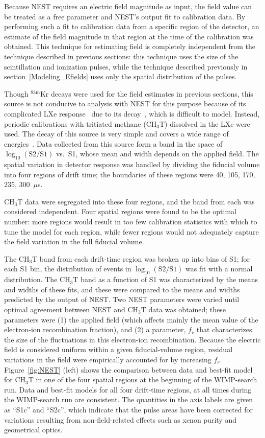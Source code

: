 \documentclass[11pt,a4paper]{article}
\newcommand{\isot}[2]{$^{\textrm{#2}}$#1 }
\newcommand{\krm}{\isot{Kr}{83m}}
\begin{document}
Because NEST requires an electric field magnitude as input, the field value can be treated as a free parameter and NEST's output fit to calibration data. By performing such a fit to calibration data from a specific region of the detector, an estimate of the field magnitude in that region at the time of the calibration was obtained. This technique for estimating field is completely independent from the technique described in previous sections: this technique uses the size of the scintillation and ionization pulses, while the technique described previously in section~\ref{Modeling_Efields} uses only the spatial distribution of the pulses.

Though \krm decays were used for the field estimates in previous sections, this source is not conducive to analysis with NEST for this purpose because of its complicated LXe response~\cite{Baudis:2013cca} due to its decay~\cite{Chan:1995tk}, which is difficult to model. Instead, periodic calibrations with tritiated methane (CH$_3$T) dissolved in the LXe were used. The decay of this source is very simple and covers a wide range of energies~\cite{Akerib:2015wdi}. Data collected from this source form a band in the space of $\log_{10}(\mathrm{S2/S1})$ vs.~S1, whose mean and width depends on the applied field. The spatial variation in detector response was handled by dividing the fiducial volume into four regions of drift time; the boundaries of these regions were 40, 105, 170, 235, 300~$\mu$s.

CH$_3$T data were segregated into these four regions, and the band from each was considered independent. Four spatial regions were found to be the optimal number: more regions would result in too few calibration statistics with which to tune the model for each region, while fewer regions would not adequately capture the field variation in the full fiducial volume.

The CH$_3$T band from each drift-time region was broken up into bins of S1; for each S1 bin, the distribution of events in $\log_{10}(\mathrm{S2/S1})$ was fit with a normal distribution. The CH$_3$T band as a function of S1 was characterized by the means and widths of these fits, and these were compared to the means and widths predicted by the output of NEST. Two NEST parameters were varied until optimal agreement between NEST and CH$_3$T data was obtained; these parameters were (1) the applied field (which affects mainly the mean value of the electron-ion recombination fraction), and (2) a parameter, $f_r$ that characterizes the size of the fluctuations in this electron-ion recombination. Because the electric field is considered uniform within a given fiducial-volume region, residual variations in the field were empirically accounted for by increasing $f_r$. Figure~\ref{fig:NEST} (left) shows the comparison between data and best-fit model for CH$_3$T in one of the four spatial regions at the beginning of the WIMP-search run. Data and best-fit models for all four drift-time regions, at all times during the WIMP-search run are consistent. The quantities in the axis labels are given as ``S1c'' and ``S2c'', which indicate that the pulse areas have been corrected for variations resulting from non-field-related effects such as xenon purity and geometrical optics.
\end{document}

